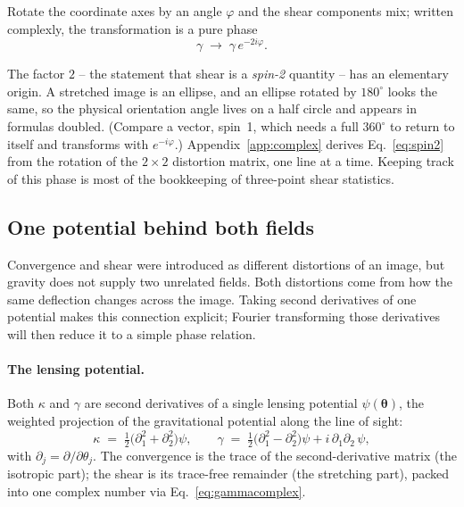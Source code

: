 \documentclass[11pt]{article}
\newcommand{\btheta}{\boldsymbol{\theta}}
\numberwithin{equation}{section}
\begin{document}
Rotate the coordinate axes by an angle $\varphi$ and the shear
components mix; written complexly, the transformation is a pure phase
\begin{equation}
  \gamma \;\longrightarrow\; \gamma\, e^{-2i\varphi} .
  \label{eq:spin2}
\end{equation}

The factor $2$ -- the statement that shear is a \emph{spin-2}
quantity -- has an elementary origin.  A stretched image is an
ellipse, and an ellipse rotated by $180^\circ$ looks the same, so the
physical orientation angle lives on a half circle and appears in
formulas doubled.  (Compare a vector, spin~1, which needs a full
$360^\circ$ to return to itself and transforms with
$e^{-i\varphi}$.)  Appendix~\ref{app:complex} derives
Eq.~\eqref{eq:spin2} from the rotation of the $2\times 2$ distortion
matrix, one line at a time.  Keeping track of this phase is most of
the bookkeeping of three-point shear statistics.

\subsection{One potential behind both fields}
\label{sec:potential}

Convergence and shear were introduced as different distortions of an
image, but gravity does not supply two unrelated fields. Both distortions
come from how the same deflection changes across the image. Taking
second derivatives of one potential makes this connection explicit;
Fourier transforming those derivatives will then reduce it to a simple
phase relation.

\paragraph{The lensing potential.}
Both $\kappa$ and $\gamma$ are second derivatives of a single lensing
potential $\psi(\btheta)$, the weighted projection of the
gravitational potential along the line of sight:
\begin{equation}
  \kappa \;=\; \tfrac{1}{2}\bigl(\partial_1^2 + \partial_2^2\bigr)\psi,
  \qquad
  \gamma
  \;=\; \tfrac{1}{2}\bigl(\partial_1^2 - \partial_2^2\bigr)\psi
        + i\,\partial_1\partial_2\,\psi ,
  \label{eq:potential}
\end{equation}
with $\partial_j = \partial/\partial\theta_j$.  The convergence is
the trace of the second-derivative matrix (the isotropic part); the
shear is its trace-free remainder (the stretching part), packed into
one complex number via Eq.~\eqref{eq:gammacomplex}.
\end{document}
